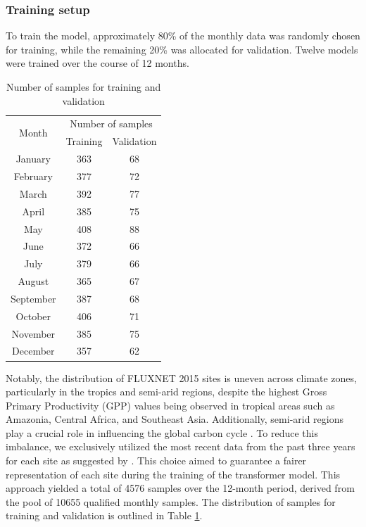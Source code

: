 \subsubsection*{Training setup}
To train the model, approximately 80\% of the monthly data was randomly chosen for training, while the remaining 20\% was allocated for validation. Twelve models were trained over the course of 12 months. \par
\begin{table}[!ht]
    \centering
    \caption{Number of samples for training and validation}
    \begin{tabular}{ccc}
        \hline
        \multirow{2}{*}{Month} & \multicolumn{2}{c}{Number of samples} \\ \cline{2-3}
        ~ & Training & Validation \\ \hline
        January & 363 & 68 \\ 
        February & 377 & 72 \\ 
        March & 392 & 77 \\ 
        April & 385 & 75 \\ 
        May & 408 & 88 \\ 
        June & 372 & 66 \\ 
        July & 379 & 66 \\ 
        August & 365 & 67 \\ 
        September & 387 & 68 \\ 
        October & 406 & 71 \\ 
        November & 385 & 75 \\ 
        December & 357 & 62 \\ \hline
    \end{tabular}
    \label{tab:chap6_nosamples}
\end{table}

Notably, the distribution of FLUXNET 2015 sites is uneven across climate zones, particularly in the tropics and semi-arid regions, despite the highest Gross Primary Productivity (GPP) values being observed in tropical areas such as Amazonia, Central Africa, and Southeast Asia\citep{chen2017regional}. Additionally, semi-arid regions play a crucial role in influencing the global carbon cycle \citep{poulter2014contribution}. To reduce this imbalance, we exclusively utilized the most recent data from the past three years for each site as suggested by \citep{zeng2020global}. This choice aimed to guarantee a fairer representation of each site during the training of the transformer model. This approach yielded a total of 4576 samples over the 12-month period, derived from the pool of 10655 qualified monthly samples. The distribution of samples for training and validation is outlined in Table \ref{tab:chap6_nosamples}. \par
